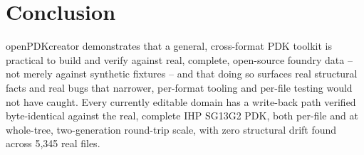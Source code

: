 \documentclass[a4paper,11pt]{article}
\begin{document}
\section{Conclusion}

openPDKcreator demonstrates that a general, cross-format PDK toolkit
is practical to build and verify against real, complete, open-source
foundry data -- not merely against synthetic fixtures -- and that
doing so surfaces real structural facts and real bugs that narrower,
per-format tooling and per-file testing would not have caught. Every
currently editable domain has a write-back path verified
byte-identical against the real, complete IHP SG13G2 PDK, both
per-file and at whole-tree, two-generation round-trip scale, with
zero structural drift found across 5{,}345 real files.
\end{document}

